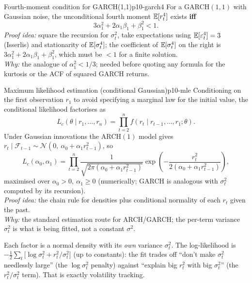 \begin{proposition}{Fourth-moment condition for GARCH(1,1)}{p10-garch4}
For a $\mathrm{GARCH}(1,1)$ with Gaussian noise, the unconditional fourth moment
$\mathbb{E}[r_t^4]$ exists \textbf{iff}
\[
3\alpha_1^2+2\alpha_1\beta_1+\beta_1^2<1 .
\]
\textit{Proof idea:} square the recursion for $\sigma_t^2$, take expectations
using $\mathbb{E}[\varepsilon_t^4]=3$ (Isserlis) and stationarity of $\mathbb{E}[\sigma_t^4]$; the
coefficient of $\mathbb{E}[\sigma_{t}^4]$ on the right is $3\alpha_1^2+2\alpha_1\beta_1+\beta_1^2$,
which must be $<1$ for a finite solution.\\
\textit{Why:} the analogue of $\alpha_1^2<1/3$; needed before quoting any
formula for the kurtosis or the ACF of squared GARCH returns.
\end{proposition}

\begin{proposition}{Maximum likelihood estimation (conditional Gaussian)}{p10-mle}
Conditioning on the first observation $r_1$ to avoid specifying a marginal law
for the initial value, the conditional likelihood factorises as
\[
L_c(\theta\mid r_1,\dots,r_n)=\prod_{t=2}^{n}f(r_t\mid r_{t-1},\dots,r_1;\theta).
\]
Under Gaussian innovations the $\mathrm{ARCH}(1)$ model gives
$r_t\mid\mathcal F_{t-1}\sim\mathcal N(0,\ \alpha_0+\alpha_1 r_{t-1}^2)$, so
\[
L_c(\alpha_0,\alpha_1)=\prod_{t=2}^{n}\frac{1}{\sqrt{2\pi(\alpha_0+\alpha_1 r_{t-1}^2)}}
\exp\!\left(-\frac{r_t^2}{2(\alpha_0+\alpha_1 r_{t-1}^2)}\right),
\]
maximised over $\alpha_0>0,\ \alpha_1\ge0$ (numerically; GARCH is analogous with
$\sigma_t^2$ computed by its recursion).\\
\textit{Proof idea:} the chain rule for densities plus conditional normality of
each $r_t$ given the past.\\
\textit{Why:} the standard estimation route for ARCH/GARCH; the per-term variance
$\sigma_t^2$ is what is being fitted, not a constant $\sigma^2$.
\end{proposition}

\begin{intuition}
Each factor is a normal density with its \emph{own} variance $\sigma_t^2$. The
log-likelihood is $-\tfrac12\sum_{t}\big[\log\sigma_t^2+r_t^2/\sigma_t^2\big]$
(up to constants): the fit trades off ``don't make $\sigma_t^2$ needlessly large''
(the $\log\sigma_t^2$ penalty) against ``explain big $r_t^2$ with big
$\sigma_t^2$'' (the $r_t^2/\sigma_t^2$ term). That is exactly volatility tracking.
\end{intuition}


